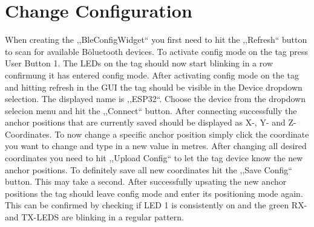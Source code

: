 \chapter{Change Configuration}

When creating the ,,BleConfigWidget`` you first need to hit the ,,Refresh`` button to scan for available Böluetooth devices. 
To activate config mode on the tag press User Button 1. 
The LEDs on the tag should now start blinking in a row confirmung it has entered config mode. 
After activating config mode on the tag and hitting refresh in the GUI the tag should be visible in the Device dropdown selection. 
The displayed name is ,,ESP32``. 
Choose the device from the dropdown selecion menu and hit the ,,Connect`` button. 
After connecting successfully the anchor positions that are currently saved should be displayed as X-, Y- and Z-Coordinates. 
\newline
\vspace{4pt}
To now change a specific anchor position simply click the coordinate you want to change and type in a new value in metres. 
After changing all desired coordinates you need to hit ,,Upload Config`` to let the tag device know the new anchor positions. 
\newline
\vspace{4pt}
To definitely save all new coordinates hit the ,,Save Config`` button. This may take a second. 
After successfully upsating the new anchor positions the tag should leave config mode and enter its positioning mode again. 
This can be confirmed by checking if LED 1 is consistently on and the green RX- and TX-LEDS are blinking in a regular pattern. 